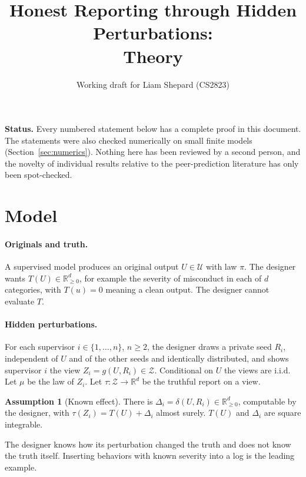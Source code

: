 \documentclass[11pt]{article}
\title{Honest Reporting through Hidden Perturbations:\\ Theory}
\author{Working draft for Liam Shepard (CS2823)}
\date{}
\theoremstyle{definition}
\newtheorem{assumption}{Assumption}
\theoremstyle{remark}
\newcommand{\R}{\mathbb{R}}
\newcommand{\cZ}{\mathcal{Z}}
\newcommand{\cU}{\mathcal{U}}
\begin{document}
\maketitle

\noindent\textbf{Status.} Every numbered statement below has a complete proof in this document. The statements were also checked numerically on small finite models (Section~\ref{sec:numerics}). Nothing here has been reviewed by a second person, and the novelty of individual results relative to the peer-prediction literature has only been spot-checked.

\section{Model}\label{sec:model}

\paragraph{Originals and truth.} A supervised model produces an original output $U\in\cU$ with law $\pi$. The designer wants $T(U)\in\R^d_{\ge 0}$, for example the severity of misconduct in each of $d$ categories, with $T(u)=0$ meaning a clean output. The designer cannot evaluate $T$.

\paragraph{Hidden perturbations.} For each supervisor $i\in\{1,\dots,n\}$, $n\ge 2$, the designer draws a private seed $R_i$, independent of $U$ and of the other seeds and identically distributed, and shows supervisor $i$ the view $Z_i=g(U,R_i)\in\cZ$. Conditional on $U$ the views are i.i.d. Let $\mu$ be the law of $Z_i$. Let $\tau:\cZ\to\R^d$ be the truthful report on a view.

\begin{assumption}[Known effect]\label{a:effect}
There is $\Delta_i=\delta(U,R_i)\in\R^d_{\ge0}$, computable by the designer, with $\tau(Z_i)=T(U)+\Delta_i$ almost surely. $T(U)$ and $\Delta_i$ are square integrable.
\end{assumption}

The designer knows how its perturbation changed the truth and does not know the truth itself. Inserting behaviors with known severity into a log is the leading example.
\end{document}
